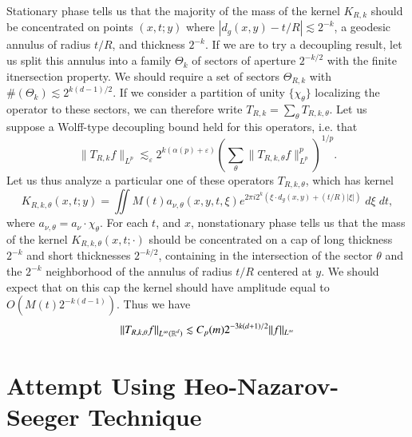 Stationary phase tells us that the majority of the mass of the kernel $K_{R,k}$ should be concentrated on points $(x,t;y)$ where $|d_g(x,y) - t/R| \lesssim 2^{-k}$, a geodesic annulus of radius $t/R$, and thickness $2^{-k}$. If we are to try a decoupling result, let us split this annulus into a family $\Theta_k$ of sectors of aperture $2^{-k/2}$ with the finite itnersection property. We should require a set of sectors $\Theta_{R,k}$ with $\#(\Theta_k) \lesssim 2^{k(d-1)/2}$. If we consider a partition of unity $\{ \chi_\theta \}$ localizing the operator to these sectors, we can therefore write $T_{R,k} = \sum_\theta T_{R,k,\theta}$. Let us suppose a Wolff-type decoupling bound held for this operators, i.e. that
%
\[ \| T_{R,k} f \|_{L^p} \lesssim_\varepsilon 2^{k(\alpha(p) + \varepsilon)} \left( \sum_\theta \| T_{R,k,\theta} f \|_{L^p}^p \right)^{1/p}. \]
%
Let us thus analyze a particular one of these operators $T_{R,k,\theta}$, which has kernel
%
\[ K_{R,k,\theta}(x,t;y) = \iint M(t) a_{\nu,\theta}(x,y,t,\xi) e^{2 \pi i 2^k (\xi \cdot d_g(x,y) + (t/R) |\xi|)}\; d\xi\; dt, \]
%
where $a_{\nu,\theta} = a_\nu \cdot \chi_\theta$. For each $t$, and $x$, nonstationary phase tells us that the mass of the kernel $K_{R,k,\theta}(x,t;\cdot)$ should be concentrated on a cap of long thickness $2^{-k}$ and short thicknesses $2^{-k/2}$, containing in the intersection of the sector $\theta$ and the $2^{-k}$ neighborhood of the annulus of radius $t/R$ centered at $y$. We should expect that on this cap the kernel should have amplitude equal to $O( M(t) 2^{-k(d-1)} )$. Thus we have
%
\[ \| T_{R,k,\theta} f \|_{L^\infty(\operatorname{\mathbb{R}}^d)} \lesssim C_p(m) 2^{-3k(d+1) / 2} \| f \|_{L^\infty} \]










\chapter{Attempt Using Heo-Nazarov-Seeger Technique}

